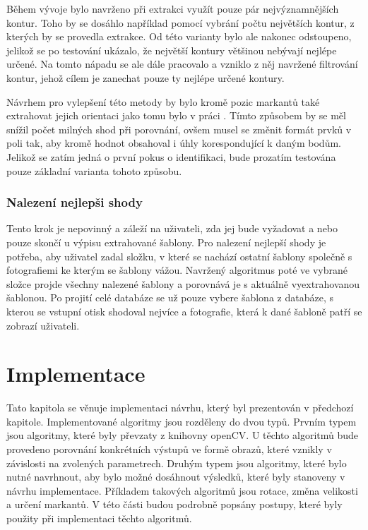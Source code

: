 Během vývoje bylo navrženo při extrakci využít pouze pár nejvýznamnějších kontur. Toho by se dosáhlo například pomocí vybrání počtu největších kontur, z kterých by se provedla extrakce. Od této varianty bylo ale nakonec odstoupeno, jelikož se po testování ukázalo, že největší kontury většinou nebývají nejlépe určené. Na tomto nápadu se ale dále pracovalo a vzniklo z něj navržené filtrování kontur, jehož cílem je zanechat pouze ty nejlépe určené kontury.


Návrhem pro vylepšení této metody by bylo kromě pozic markantů také extrahovat jejich orientaci jako tomu bylo v práci \cite{NOVIYANTO201377}. Tímto způsobem by se měl snížil počet milných shod při porovnání, ovšem musel se změnit formát prvků v poli tak, aby kromě hodnot obsahoval i úhly korespondující k daným bodům. Jelikož se zatím jedná o první pokus o identifikaci, bude prozatím testována pouze základní varianta tohoto způsobu.


\subsection{Nalezení nejlepši shody}

Tento krok je nepovinný a záleží na uživateli, zda jej bude vyžadovat a nebo pouze skončí u výpisu extrahované šablony. Pro nalezení nejlepší shody je potřeba, aby uživatel zadal složku, v které se nachází ostatní šablony společně s fotografiemi ke kterým se šablony vážou. Navržený algoritmus poté ve vybrané složce projde všechny nalezené šablony a porovnává je s aktuálně vyextrahovanou šablonou. Po projití celé databáze se už pouze vybere šablona z databáze, s kterou se vstupní otisk shodoval nejvíce a fotografie, která k dané šabloně patří se zobrazí uživateli.




\chapter{Implementace}
Tato kapitola se věnuje implementaci návrhu, který byl prezentován v předchozí kapitole. Implementované algoritmy jsou rozděleny do dvou typů. Prvním typem jsou algoritmy, které byly převzaty z knihovny openCV. U těchto algoritmů bude provedeno porovnání konkrétních výstupů ve formě obrazů, které vznikly v závislosti na zvolených parametrech. Druhým typem jsou algoritmy, které bylo nutné navrhnout, aby bylo možné dosáhnout výsledků, které byly stanoveny v návrhu implementace. Příkladem takových algoritmů jsou rotace, změna velikosti a určení markantů. V této části budou podrobně popsány postupy, které byly použity při implementaci těchto algoritmů.

